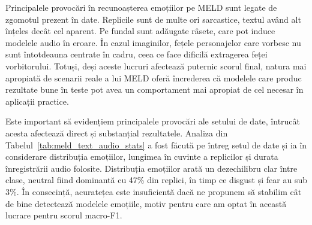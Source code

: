 \documentclass[12pt, a4paper]{article}
\begin{document}
Principalele provocări în recunoașterea emoțiilor pe MELD sunt legate de zgomotul prezent în date. Replicile sunt de multe ori sarcastice, textul având alt înțeles decât cel aparent. Pe fundal sunt adăugate râsete, care pot induce modelele audio în eroare. În cazul imaginilor, fețele personajelor care vorbesc nu sunt întotdeauna centrate în cadru, ceea ce face dificilă extragerea feței vorbitorului. Totuși, deși aceste lucruri afectează puternic scorul final, natura mai apropiată de scenarii reale a lui MELD oferă încrederea că modelele care produc rezultate bune în teste pot avea un comportament mai apropiat de cel necesar în aplicații practice.

Este important să evidențiem principalele provocări ale setului de date, întrucât acesta afectează direct și substanțial rezultatele. Analiza din Tabelul~\ref{tab:meld_text_audio_stats} a fost făcută pe întreg setul de date și ia în considerare distribuția emoțiilor, lungimea în cuvinte a replicilor și durata înregistrării audio folosite. Distribuția emoțiilor arată un dezechilibru clar între clase, neutral fiind dominantă cu 47\% din replici, în timp ce disgust și fear au sub 3\%. În consecință, acuratețea este insuficientă dacă ne propunem să stabilim cât de bine detectează modelele emoțiile, motiv pentru care am optat în această lucrare pentru scorul macro-F1.

\begin{table}[h]
\centering
\small

\label{tab:meld_text_audio_stats}
\caption{Statistici MELD per emotie. Secventele audio au fost truncate la 10s.}
\end{table}
\end{document}
